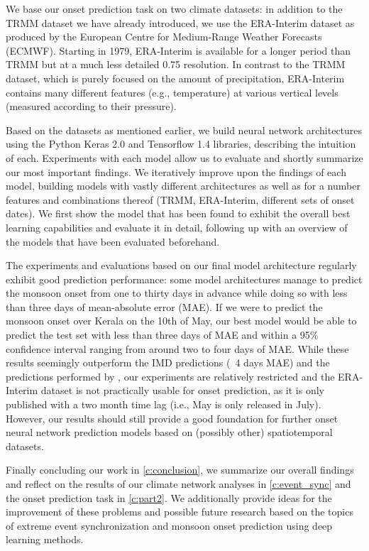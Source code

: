 We base our onset prediction task on two climate datasets: in addition to the TRMM dataset we have already introduced, we use the ERA-Interim dataset as produced by the European Centre for Medium-Range Weather Forecasts (ECMWF). Starting in 1979, ERA-Interim is available for a longer period than TRMM but at a much less detailed {0.75\degree} resolution. In contrast to the TRMM dataset, which is purely focused on the amount of precipitation, ERA-Interim contains many different features (e.g., temperature) at various vertical levels (measured according to their pressure).

Based on the datasets as mentioned earlier, we build neural network architectures using the Python Keras 2.0 and Tensorflow 1.4 libraries, describing the intuition of each. Experiments with each model allow us to evaluate and shortly summarize our most important findings. We iteratively improve upon the findings of each model, building models with vastly different architectures as well as for a number features and combinations thereof (TRMM, ERA-Interim, different sets of onset dates). We first show the model that has been found to exhibit the overall best learning capabilities and evaluate it in detail, following up with an overview of the models that have been evaluated beforehand.

The experiments and evaluations based on our final model architecture regularly exhibit good prediction performance: some model architectures manage to predict the monsoon onset from one to thirty days in advance while doing so with less than three days of mean-absolute error (MAE). If we were to predict the monsoon onset over Kerala on the 10th of May, our best model would be able to predict the test set with less than three days of MAE and within a 95\% confidence interval ranging from around two to four days of MAE. While these results seemingly outperform the IMD predictions (~4 days MAE) and the predictions performed by \citet{Stolbova.2015}, our experiments are relatively restricted and the ERA-Interim dataset is not practically usable for onset prediction, as it is only published with a two month time lag (i.e., May is only released in July). However, our results should still provide a good foundation for further onset neural network prediction models based on (possibly other) spatiotemporal datasets.

Finally concluding our work in \cref{c:conclusion}, we summarize our overall findings and reflect on the results of our climate network analyses in \cref{c:event_sync} and the onset prediction task in \cref{c:part2}. We additionally provide ideas for the improvement of these problems and possible future research based on the topics of extreme event synchronization and monsoon onset prediction using deep learning methods.
